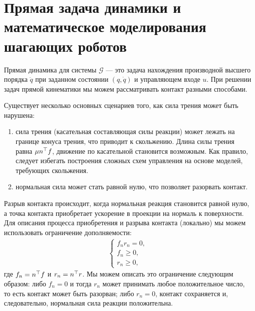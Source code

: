 \section{Прямая задача динамики и математическое моделирования шагающих роботов}\label{sec:ch2/sect5}
Прямая динамика для системы $\mathcal{G}$ --- это задача нахождения производной высшего порядка $\ddot{{q}}$ при заданном состоянии $({q}, \dot{{q}})$ и управляющем входе ${u}$. При решении задач прямой кинематики мы можем рассматривать контакт разными способами.

Существует несколько основных сценариев того, как сила трения может быть нарушена:
%
\begin{enumerate}
	\item сила трения (касательная составляющая силы реакции) может лежать на границе конуса трения, что приводит к скольжению. Длина силы трения равна $\mu {n}^\top {f}$, движение по касательной становится возможным. Как правило, следует избегать построения сложных схем управления на основе моделей, требующих скольжения.
	\item нормальная сила может стать равной нулю, что позволяет разорвать контакт.
\end{enumerate}

Разрыв контакта происходит, когда нормальная реакция становится равной нулю, а точка контакта приобретает ускорение в проекции на нормаль к поверхности.
%
Для описания процесса приобретения и разрыва контакта (локально) мы можем использовать ограничение дополняемости:
%
\begin{align}
	\label{eq:part2_cond}
	\begin{cases}
		f_n r_n = 0, \\
		f_n \geq 0, \\
		r_n \geq 0,
	\end{cases}
\end{align}
где $f_n = {n}^\top{f}$ и $r_n ={n}^\top{r}$. Мы можем описать это ограничение следующим образом: либо $f_n = 0$ и тогда $r_n$ может принимать любое положительное число, то есть контакт может быть разорван; либо $r_n = 0$, контакт сохраняется и, следовательно, нормальная сила реакции положительна.

